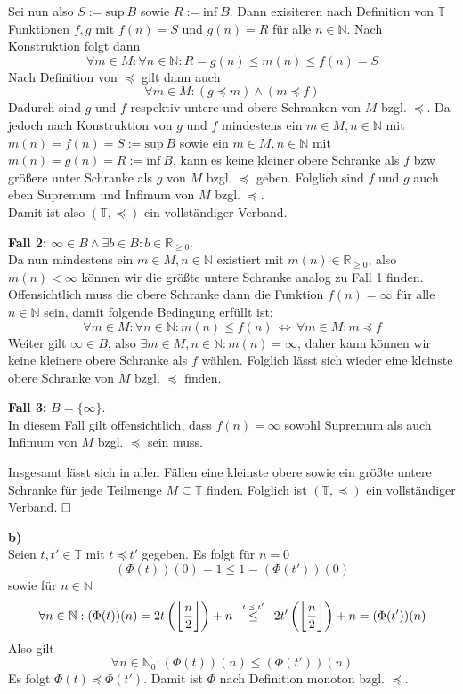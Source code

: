\documentclass[a4paper,graphics,11pt]{article}
\newcommand{\up}[2]{\mathrel{\overset{\makebox[0pt]{\mbox{\normalfont\tiny #2}}}{#1}}}
\begin{document}
Sei nun also $S := \text{sup}\ B$ sowie $R := \text{inf}\ B$. Dann exisiteren nach Definition von $\mathbb{T}$
Funktionen $f,g$ mit $f(n) = S$ und $g(n) = R$ für alle $n \in \mathbb{N}$. Nach Konstruktion folgt dann
$$
    \forall m \in M : \forall n \in \mathbb{N} : R = g(n) \leq m(n) \leq f(n) = S
$$
Nach Definition von $\preceq$ gilt dann auch
$$
    \forall m \in M : (g \preceq m) \land (m \preceq f)
$$
Dadurch sind $g$ und $f$ respektiv untere und obere Schranken von $M$ bzgl. $\preceq$. Da jedoch nach Konstruktion
von $g$ und $f$ mindestens ein $m \in M, n \in \mathbb{N}$ mit $m(n) = f(n) = S := \text{sup}\ B$ sowie
ein $m \in M, n \in \mathbb{N}$ mit $m(n) = g(n) = R := \text{inf}\ B$, kann es keine kleiner obere
Schranke als $f$ bzw größere unter Schranke als $g$ von $M$ bzgl. $\preceq$ geben. Folglich sind
$f$ und $g$ auch eben Supremum und Infimum von $M$ bzgl. $\preceq$.\\
Damit ist also $(\mathbb{T}, \preceq)$ ein vollständiger Verband.

\textbf{Fall 2:} $\infty \in B \land \exists b \in B : b \in \mathbb{R}_{\geq 0}$.\\
Da nun mindestens ein $m \in M, n \in \mathbb{N}$ existiert mit $m(n) \in \mathbb{R}_{\geq 0}$, also $m(n) < \infty$
können wir die größte untere Schranke analog zu Fall 1 finden. Offensichtlich muss die obere Schranke
dann die Funktion $f(n) = \infty$ für alle $n \in \mathbb{N}$ sein, damit folgende Bedingung erfüllt ist:
$$
    \forall m \in M : \forall n \in \mathbb{N} : m(n) \leq f(n)
    \,\Longleftrightarrow\, \forall m \in M : m \preceq f
$$
Weiter gilt $\infty \in B$, also $\exists m \in M, n \in \mathbb{N} : m(n) = \infty$, daher kann können wir keine
kleinere obere Schranke als $f$ wählen. Folglich lässt sich wieder eine kleinste obere Schranke von $M$
bzgl. $\preceq$ finden.

\textbf{Fall 3:} $B = \{\infty\}$.\\
In diesem Fall gilt offensichtlich, dass $f(n) = \infty$ sowohl Supremum als auch Infimum von $M$ bzgl. $\preceq$
sein muss.

Insgesamt lässt sich in allen Fällen eine kleinste obere sowie ein größte untere Schranke für jede Teilmenge
$M \subseteq \mathbb{T}$ finden. Folglich ist $(\mathbb{T}, \preceq)$ ein vollständiger Verband. $\hfill\square$

\textbf{b)}\\
Seien $t, t' \in \mathbb{T}$ mit $t \preceq t'$ gegeben. Es folgt für $n = 0$
$$
    (\Phi(t))(0) = 1 \leq 1 = (\Phi(t'))(0)
$$
sowie für $n \in \mathbb{N}$
$$
    \forall n \in \mathbb{N}: (\Phi(t))(n)
    = 2t\left(\bigg\lfloor\frac{n}{2}\bigg\rfloor\right)+n
    \quad\up{\leq}{$t \preceq t'$}\quad
    2t'\left(\bigg\lfloor\frac{n}{2}\bigg\rfloor\right)+n
    = (\Phi(t'))(n)
$$
Also gilt
$$
    \forall n \in \mathbb{N}_0 : (\Phi(t))(n) \leq (\Phi(t'))(n)
$$
Es folgt $\Phi(t) \preceq \Phi(t')$. Damit ist $\Phi$ nach Definition monoton bzgl. $\preceq$.
\end{document}
